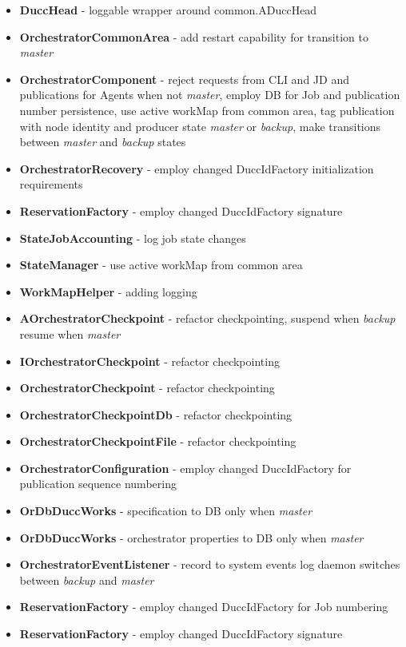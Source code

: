 \documentclass[letterpaper]{article}
\begin{document}
{\renewcommand\labelitemi{}
\begin{itemize}
  \item \textbf{DuccHead} - loggable wrapper around common.ADuccHead
  \item \textbf{OrchestratorCommonArea} - add restart capability for transition to {\em master}
  \item \textbf{OrchestratorComponent} - reject requests from CLI and JD and publications for Agents when not {\em master}, employ DB for Job and publication number persistence, use active workMap from common area, tag publication with node identity and producer state {\em master} or {\em backup}, make transitions between {\em master} and {\em backup} states
  \item \textbf{OrchestratorRecovery} - employ changed DuccIdFactory initialization requirements
  \item \textbf{ReservationFactory} - employ changed DuccIdFactory signature
  \item \textbf{StateJobAccounting} - log job state changes
  \item \textbf{StateManager} - use active workMap from common area
  \item \textbf{WorkMapHelper} - adding logging 
  \item \textbf{AOrchestratorCheckpoint} - refactor checkpointing, suspend when {\em backup} resume when {\em master}
  \item \textbf{IOrchestratorCheckpoint} - refactor checkpointing
  \item \textbf{OrchestratorCheckpoint} - refactor checkpointing
  \item \textbf{OrchestratorCheckpointDb} - refactor checkpointing
  \item \textbf{OrchestratorCheckpointFile} - refactor checkpointing
  \item \textbf{OrchestratorConfiguration} - employ changed DuccIdFactory for publication sequence numbering
  \item \textbf{OrDbDuccWorks} - specification to DB only when {\em master}
  \item \textbf{OrDbDuccWorks} - orchestrator properties to DB only when {\em master}
  \item \textbf{OrchestratorEventListener} - record to system events log daemon switches between {\em backup} and {\em master} 
  \item \textbf{ReservationFactory} - employ changed DuccIdFactory for Job numbering\item \textbf{ReservationFactory} - employ changed DuccIdFactory signature

\end{itemize}}
\end{document}
